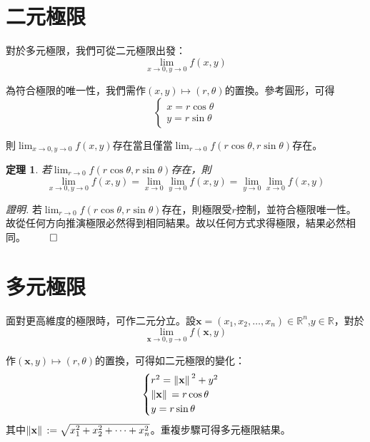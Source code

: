 \documentclass[12pt]{article}
\newtheorem*{theorem}{定理}
\renewenvironment*{proof}{\textit{證明.}}{\hfill$\qed$}
\begin{document}
    \section*{二元極限}

    對於多元極限，我們可從二元極限出發：$$\lim_{x\to 0, y\to 0}f(x,y)$$

    為符合極限的唯一性，我們需作$(x,y)\mapsto(r,\theta)$的置換。參考圓形，可得$$\begin{cases}
        x=r\cos{\theta}\\y=r\sin{\theta}
    \end{cases}$$

    則$\displaystyle \lim_{x\to 0, y\to 0}f(x,y)$存在當且僅當$\displaystyle\lim_{r\to 0}f(r\cos{\theta},r\sin{\theta})$存在。

    \begin{theorem}
        若$\displaystyle\lim_{r\to 0}f(r\cos{\theta},r\sin{\theta})$存在，則$$\lim_{x\to 0, y\to 0}f(x,y)=\lim_{x\to 0}\lim_{y\to 0}f(x,y)=\lim_{y\to 0}\lim_{x\to 0}f(x,y)$$
    \end{theorem}

    \begin{proof}
        若$\displaystyle\lim_{r\to 0}f(r\cos{\theta},r\sin{\theta})$存在，則極限受$r$控制，並符合極限唯一性。故從任何方向推演極限必然得到相同結果。故以任何方式求得極限，結果必然相同。
    \end{proof}

    \section*{多元極限}

    面對更高維度的極限時，可作二元分立。設$\mathbf{x}=(x_1,x_2,\dots,x_n)\in\mathbb{R}^n$,$y\in\mathbb{R}$，對於$$\lim_{\mathbf{x}\to 0,y\to 0}f(\mathbf{x},y)$$

    作$(\mathbf{x},y)\mapsto(r,\theta)$的置換，可得如二元極限的變化：$$\begin{cases}
        r^2=\norm*{\mathbf{x}}^2+y^2\\
        \norm*{\mathbf{x}}=r\cos{\theta}\\
        y=r\sin{\theta}
    \end{cases}$$
    其中$\norm*{\mathbf{x}}:=\sqrt{x_1^2+x_2^2+\cdots+x_n^2}$。重複步驟可得多元極限結果。
\end{document}
